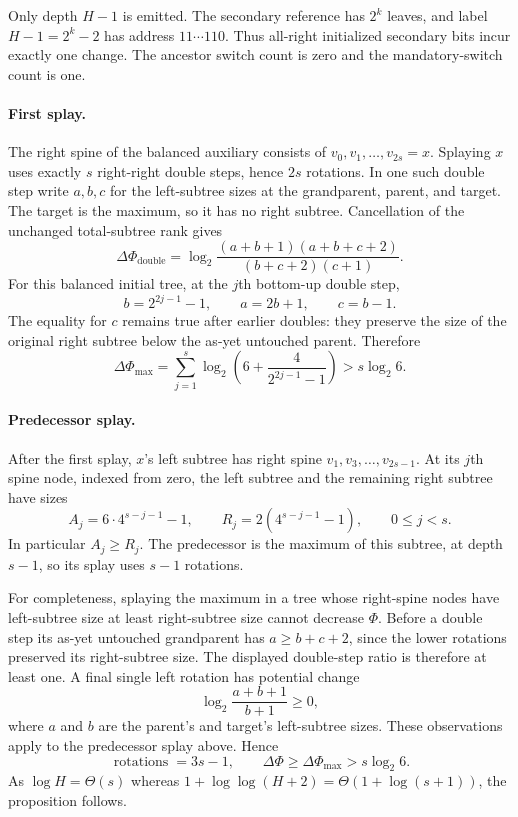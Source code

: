 \documentclass[11pt]{article}
\begin{document}
Only depth $H-1$ is emitted. The secondary reference has $2^k$ leaves,
and label $H-1=2^k-2$ has address $11\cdots110$. Thus all-right
initialized secondary bits incur exactly one change. The ancestor
switch count is zero and the mandatory-switch count is one.

\paragraph{First splay.}
The right spine of the balanced auxiliary consists of
$v_0,v_1,\ldots,v_{2s}=x$. Splaying $x$ uses exactly $s$ right-right
double steps, hence $2s$ rotations. In one such double step write $a,b,c$
for the left-subtree sizes at the grandparent, parent, and target.
The target is the maximum, so it has no right subtree. Cancellation
of the unchanged total-subtree rank gives
\[
 \Delta\Phi_{\mathrm{double}}
 =\log_2\frac{(a+b+1)(a+b+c+2)}{(b+c+2)(c+1)}.
\]
For this balanced initial tree, at the $j$th bottom-up double step,
\[
 b=2^{2j-1}-1,\qquad a=2b+1,\qquad c=b-1.
\]
The equality for $c$ remains true after earlier doubles: they preserve
the size of the original right subtree below the as-yet untouched
parent. Therefore
\[
 \Delta\Phi_{\max}
 =\sum_{j=1}^s\log_2\left(6+\frac4{2^{2j-1}-1}\right)
 >s\log_2 6.
\]

\paragraph{Predecessor splay.}
After the first splay, $x$'s left subtree has right spine
$v_1,v_3,\ldots,v_{2s-1}$. At its $j$th spine node, indexed from zero,
the left subtree and the remaining right subtree have sizes
\[
 A_j=6\cdot4^{s-j-1}-1,
 \qquad R_j=2(4^{s-j-1}-1),\qquad 0\le j<s.
\]
In particular $A_j\ge R_j$. The predecessor is the maximum of this
subtree, at depth $s-1$, so its splay uses $s-1$ rotations.

For completeness, splaying the maximum in a tree whose right-spine
nodes have left-subtree size at least right-subtree size cannot decrease
$\Phi$. Before a double step its as-yet untouched grandparent has
$a\ge b+c+2$, since the lower rotations preserved its right-subtree
size. The displayed double-step ratio is therefore at least one.
A final single left rotation has potential change
\[
 \log_2\frac{a+b+1}{b+1}\ge0,
\]
where $a$ and $b$ are the parent's and target's left-subtree sizes.
These observations apply to the predecessor splay above. Hence
\[
 \operatorname{rotations}=3s-1,\qquad
 \Delta\Phi\ge\Delta\Phi_{\max}>s\log_2 6.
\]
As $\log H=\Theta(s)$ whereas
$1+\log\log(H+2)=\Theta(1+\log(s+1))$, the proposition follows.
\end{document}
